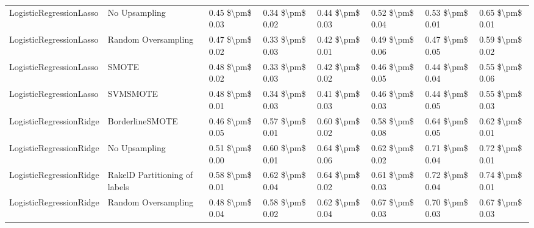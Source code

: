 \begin{tabular}{llllllll}
        LogisticRegressionLasso &                 No Upsampling & 0.45 \$\textbackslash pm\$ 0.03 &           0.34 \$\textbackslash pm\$ 0.02 &       0.44 \$\textbackslash pm\$ 0.03 &        0.52 \$\textbackslash pm\$ 0.04 &                         0.53 \$\textbackslash pm\$ 0.01 & 0.65 \$\textbackslash pm\$ 0.01 \\
        LogisticRegressionLasso &           Random Oversampling & 0.47 \$\textbackslash pm\$ 0.02 &           0.33 \$\textbackslash pm\$ 0.03 &       0.42 \$\textbackslash pm\$ 0.01 &        0.49 \$\textbackslash pm\$ 0.06 &                         0.47 \$\textbackslash pm\$ 0.05 & 0.59 \$\textbackslash pm\$ 0.02 \\
        LogisticRegressionLasso &                         SMOTE & 0.48 \$\textbackslash pm\$ 0.02 &           0.33 \$\textbackslash pm\$ 0.03 &       0.42 \$\textbackslash pm\$ 0.02 &        0.46 \$\textbackslash pm\$ 0.05 &                         0.44 \$\textbackslash pm\$ 0.04 & 0.55 \$\textbackslash pm\$ 0.06 \\
        LogisticRegressionLasso &                      SVMSMOTE & 0.48 \$\textbackslash pm\$ 0.01 &           0.34 \$\textbackslash pm\$ 0.03 &       0.41 \$\textbackslash pm\$ 0.03 &        0.46 \$\textbackslash pm\$ 0.03 &                         0.44 \$\textbackslash pm\$ 0.05 & 0.55 \$\textbackslash pm\$ 0.03 \\
        LogisticRegressionRidge &               BorderlineSMOTE & 0.46 \$\textbackslash pm\$ 0.05 &           0.57 \$\textbackslash pm\$ 0.01 &       0.60 \$\textbackslash pm\$ 0.02 &        0.58 \$\textbackslash pm\$ 0.08 &                         0.64 \$\textbackslash pm\$ 0.05 & 0.62 \$\textbackslash pm\$ 0.01 \\
        LogisticRegressionRidge &                 No Upsampling & 0.51 \$\textbackslash pm\$ 0.00 &           0.60 \$\textbackslash pm\$ 0.01 &       0.64 \$\textbackslash pm\$ 0.06 &        0.62 \$\textbackslash pm\$ 0.02 &                         0.71 \$\textbackslash pm\$ 0.04 & 0.72 \$\textbackslash pm\$ 0.01 \\
        LogisticRegressionRidge & RakelD Partitioning of labels & 0.58 \$\textbackslash pm\$ 0.01 &           0.62 \$\textbackslash pm\$ 0.04 &       0.64 \$\textbackslash pm\$ 0.02 &        0.61 \$\textbackslash pm\$ 0.03 &                         0.72 \$\textbackslash pm\$ 0.04 & 0.74 \$\textbackslash pm\$ 0.01 \\
        LogisticRegressionRidge &           Random Oversampling & 0.48 \$\textbackslash pm\$ 0.04 &           0.58 \$\textbackslash pm\$ 0.02 &       0.62 \$\textbackslash pm\$ 0.04 &        0.67 \$\textbackslash pm\$ 0.03 &                         0.70 \$\textbackslash pm\$ 0.03 & 0.67 \$\textbackslash pm\$ 0.03 \\

\end{tabular}
